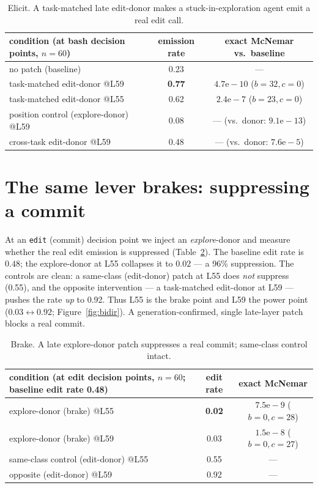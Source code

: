 \documentclass[11pt]{article}
\begin{document}
\begin{table}[t]\centering\small
\begin{tabular}{lcc}
\toprule
condition (at bash decision points, $n{=}60$) & emission rate & exact McNemar vs.\ baseline \\
\midrule
no patch (baseline) & 0.23 & --- \\
task-matched edit-donor @L59 & \textbf{0.77} & $4.7\mathrm{e}{-}10$ ($b{=}32,c{=}0$) \\
task-matched edit-donor @L55 & 0.62 & $2.4\mathrm{e}{-}7$ ($b{=}23,c{=}0$) \\
position control (explore-donor) @L59 & 0.08 & --- (vs.\ donor: $9.1\mathrm{e}{-}13$) \\
cross-task edit-donor @L59 & 0.48 & --- (vs.\ donor: $7.6\mathrm{e}{-}5$) \\
\bottomrule
\end{tabular}
\caption{Elicit. A task-matched late edit-donor makes a stuck-in-exploration agent emit a real edit call.}
\label{tab:h1}
\end{table}

\section{The same lever brakes: suppressing a commit}\label{sec:brake}
At an \texttt{edit} (commit) decision point we inject an \emph{explore}-donor and measure whether the real edit
emission is suppressed (Table~\ref{tab:h2}). The baseline edit rate is $0.48$; the explore-donor at L55
collapses it to $0.02$ --- a 96\% suppression. The controls are clean: a same-class (edit-donor) patch at L55
does \emph{not} suppress (0.55), and the opposite intervention --- a task-matched edit-donor at L59 --- pushes
the rate \emph{up} to 0.92. Thus L55 is the brake point and L59 the power point ($0.03 \leftrightarrow 0.92$;
Figure~\ref{fig:bidir}). A generation-confirmed, single late-layer patch blocks a real commit.

\begin{table}[t]\centering\small
\begin{tabular}{lcc}
\toprule
condition (at edit decision points, $n{=}60$; baseline edit rate 0.48) & edit rate & exact McNemar \\
\midrule
explore-donor (brake) @L55 & \textbf{0.02} & $7.5\mathrm{e}{-}9$ ($b{=}0,c{=}28$) \\
explore-donor (brake) @L59 & 0.03 & $1.5\mathrm{e}{-}8$ ($b{=}0,c{=}27$) \\
same-class control (edit-donor) @L55 & 0.55 & --- \\
opposite (edit-donor) @L59 & 0.92 & --- \\
\bottomrule
\end{tabular}
\caption{Brake. A late explore-donor patch suppresses a real commit; same-class control intact.}
\label{tab:h2}
\end{table}
\end{document}
